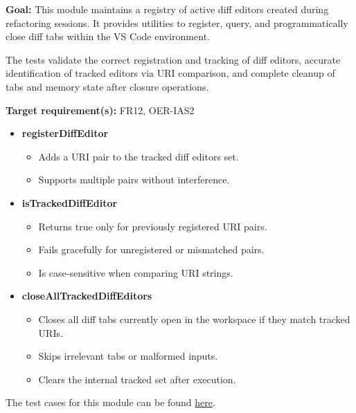 \documentclass[12pt, titlepage]{article}
\begin{document}
\textbf{Goal:} This module maintains a registry of active diff editors created during refactoring sessions. It provides utilities to register, query, and programmatically close diff tabs within the VS Code environment.

\medskip

\noindent The tests validate the correct registration and tracking of diff editors, accurate identification of tracked editors via URI comparison, and complete cleanup of tabs and memory state after closure operations.

\medskip

\noindent\textbf{Target requirement(s):} FR12, OER-IAS2~\cite{SRS}

\begin{itemize}
  \item \textbf{registerDiffEditor}
    \begin{itemize}
      \item Adds a URI pair to the tracked diff editors set.
      \item Supports multiple pairs without interference.
    \end{itemize}

  \item \textbf{isTrackedDiffEditor}
    \begin{itemize}
      \item Returns true only for previously registered URI pairs.
      \item Fails gracefully for unregistered or mismatched pairs.
      \item Is case-sensitive when comparing URI strings.
    \end{itemize}

  \item \textbf{closeAllTrackedDiffEditors}
    \begin{itemize}
      \item Closes all diff tabs currently open in the workspace if they match tracked URIs.
      \item Skips irrelevant tabs or malformed inputs.
      \item Clears the internal tracked set after execution.
    \end{itemize}
\end{itemize}

\noindent The test cases for this module can be found
\href{https://github.com/ssm-lab/capstone--sco-vs-code-plugin/blob/plugin-multi-file/test/utils/trackedDiffEditors.test.ts}{here}.
\end{document}
